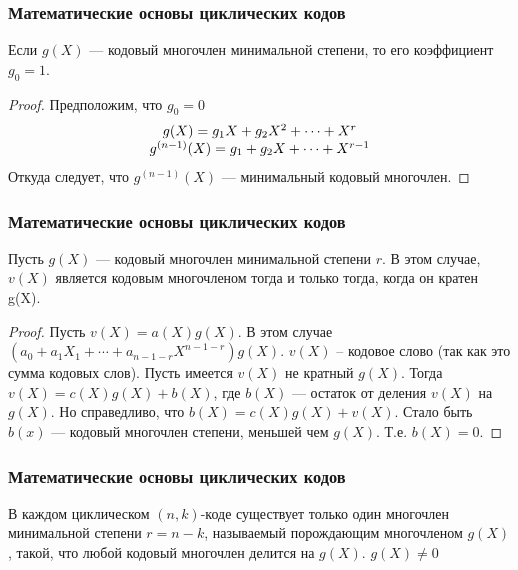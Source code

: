 \begin{frame}
    \frametitle{Математические основы циклических кодов}
    
    \begin{theorem}
        Если $g(X)$ --- кодовый многочлен минимальной степени, то его коэффициент $g_0=1$.
    \end{theorem}
    
    \begin{proof}
        Предположим, что $g_0=0$
        \[
            \begin{array}[c]{c}
                g(X)=g_1X+g_2X^2+\cdots+X^r\\
                g^{(n-1)}(X)=g_1+g_2X+\cdots+X^{r-1}
            \end{array}
        \]
        Откуда следует, что $g^{(n-1)}(X)$ --- минимальный кодовый многочлен.
    \end{proof}
\end{frame}


\begin{frame}
    \frametitle{Математические основы циклических кодов}
    
    \begin{theorem}
        Пусть  $g(X)$ --- кодовый многочлен минимальной степени $r$. В этом случае, $v(X)$ является кодовым многочленом тогда и только тогда, когда он кратен g(X).
    \end{theorem}
    
    \begin{proof}
        Пусть $v(X)=a(X)g(X)$. В этом случае $(a_0 + a_1X_1 + \cdots +a_{n-1-r}X^{n-1-r})g(X)$. $v(X)$ – кодовое слово (так как это сумма кодовых слов). Пусть имеется  $v(X)$ не кратный $g(X)$. Тогда $v(X)=c(X)g(X)+b(X)$, где $b(X)$ --- остаток от деления $v(X)$ на $g(X)$. Но справедливо, что $b(X)=c(X)g(X)+v(X)$. Стало быть $b(x)$ --- кодовый многочлен степени, меньшей чем $g(X)$. Т.е. $b(X)=0$.
    \end{proof}
\end{frame}


\begin{frame}
    \frametitle{Математические основы циклических кодов}
    
    \begin{definition}
        В каждом циклическом $(n,k)$-коде существует только один многочлен минимальной степени $r=n-k$, называемый \alert{порождающим} многочленом $g(X)$, такой, что любой кодовый многочлен делится на $g(X)$. $g(X)\neq 0$
    \end{definition}
\end{frame}


